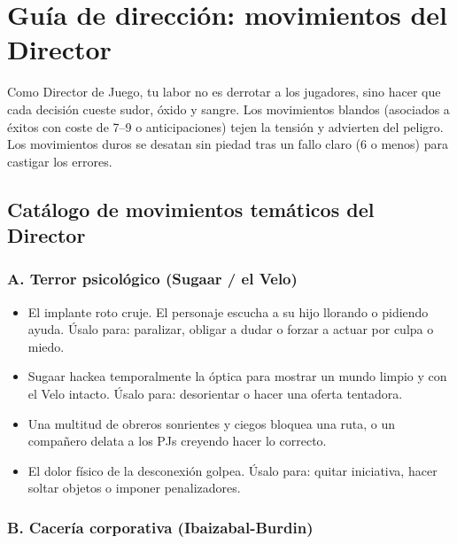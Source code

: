 \chapter{Guía de dirección: movimientos del Director}

Como Director de Juego, tu labor no es derrotar a los jugadores, sino hacer que cada decisión cueste sudor, óxido y sangre. Los movimientos blandos (asociados a éxitos con coste de 7--9 o anticipaciones) tejen la tensión y advierten del peligro. Los movimientos duros se desatan sin piedad tras un fallo claro (6 o menos) para castigar los errores.

\section{Catálogo de movimientos temáticos del Director}

\subsection{A. Terror psicológico (Sugaar / el Velo)}

\begin{itemize}
  \item {} El implante roto cruje. El personaje escucha a su hijo llorando o pidiendo ayuda. Úsalo para: paralizar, obligar a dudar o forzar a actuar por culpa o miedo.
  \item {} Sugaar hackea temporalmente la óptica para mostrar un mundo limpio y con el Velo intacto. Úsalo para: desorientar o hacer una oferta tentadora.
  \item {} Una multitud de obreros sonrientes y ciegos bloquea una ruta, o un compañero delata a los PJs creyendo hacer lo correcto.
  \item {} El dolor físico de la desconexión golpea. Úsalo para: quitar iniciativa, hacer soltar objetos o imponer penalizadores.
\end{itemize}

\subsection{B. Cacería corporativa (Ibaizabal-Burdin)}


